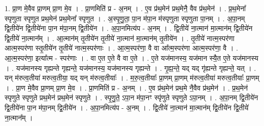 \documentclass[17pt]{extarticle}
\begin{document}
1. प्रा॒ण मे॒वैव प्रा॒णम् प्रा॒ण मे॒व । . प्रा॒णमिति॑ प्र - अ॒नम् । . ए॒व प्र॑थ॒मेन॑ प्रथ॒मेनै॒ वैव प्र॑थ॒मेन॑ । . प्र॒थ॒मेना᳚ स्पृणुता स्पृणुत प्रथ॒मेन॑ प्रथ॒मेना᳚ स्पृणुत । . अ॒स्पृ॒णु॒ता॒ पा॒न म॑पा॒न म॑स्पृणुता स्पृणुता पा॒नम् । . अ॒पा॒नम् द्वि॒तीये॑न द्वि॒तीये॑ना पा॒न म॑पा॒नम् द्वि॒तीये॑न । . अ॒पा॒नमित्य॑प - अ॒नम् । . द्वि॒तीये॑ ना॒त्मान॑ मा॒त्मान॑म् द्वि॒तीये॑न द्वि॒तीये॑ ना॒त्मान᳚म् । . आ॒त्मान॑म् तृ॒तीये॑न तृ॒तीये॑ ना॒त्मान॑ मा॒त्मान॑म् तृ॒तीये॑न । . तृ॒तीये॑ नात्म॒स्पर॑णा आत्म॒स्पर॑णा स्तृ॒तीये॑न तृ॒तीये॑ नात्म॒स्पर॑णाः । . आ॒त्म॒स्पर॑णा॒ वै वा आ᳚त्म॒स्पर॑णा आत्म॒स्पर॑णा॒ वै । . आ॒त्म॒स्पर॑णा॒ इत्या᳚त्म - स्पर॑णाः । . वा ए॒त ए॒ते वै वा ए॒ते । . ए॒ते यज॑मानस्य॒ यज॑मान स्यै॒त ए॒ते यज॑मानस्य । . यज॑मानस्य गृह्यन्ते गृह्यन्ते॒ यज॑मानस्य॒ यज॑मानस्य गृह्यन्ते । . गृ॒ह्य॒न्ते॒ यद् यद् गृ॑ह्यन्ते गृह्यन्ते॒ यत् । . यन् म॑रुत्व॒तीया॑ मरुत्व॒तीया॒ यद् यन् म॑रुत्व॒तीयाः᳚ । . म॒रु॒त्व॒तीयाः᳚ प्रा॒णम् प्रा॒णम् म॑रुत्व॒तीया॑ मरुत्व॒तीयाः᳚ प्रा॒णम् । . प्रा॒ण मे॒वैव प्रा॒णम् प्रा॒ण मे॒व । . प्रा॒णमिति॑ प्र - अ॒नम् । . ए॒व प्र॑थ॒मेन॑ प्रथ॒मे नै॒वैव प्र॑थ॒मेन॑ । . प्र॒थ॒मेन॑ स्पृणुते स्पृणुते प्रथ॒मेन॑ प्रथ॒मेन॑ स्पृणुते । . स्पृ॒णु॒ते॒ ऽपा॒न म॑पा॒नꣳ स्पृ॑णुते स्पृणुते ऽपा॒नम् । . अ॒पा॒नम् द्वि॒तीये॑न द्वि॒तीये॑ना पा॒न म॑पा॒नम् द्वि॒तीये॑न । . अ॒पा॒नमित्य॑प - अ॒नम् । . द्वि॒तीये॑ ना॒त्मान॑ मा॒त्मान॑म् द्वि॒तीये॑न द्वि॒तीये॑ ना॒त्मान᳚म् । \newline
\end{document}
